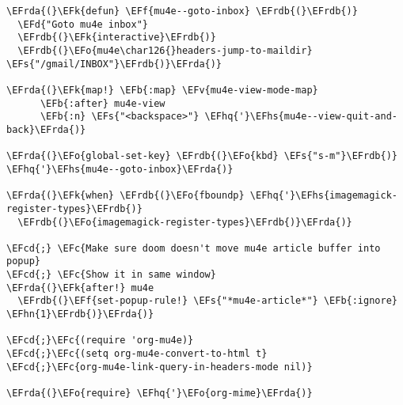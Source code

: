 \documentclass[a4wide,10pt]{article}
\newcommand{\EFc}[1]{\textcolor{EFc}{#1}} %
\newcommand{\EFcd}[1]{\textcolor{EFcd}{#1}} %
\newcommand{\EFs}[1]{\textcolor{EFs}{#1}} %
\newcommand{\EFd}[1]{\textcolor{EFd}{#1}} %
\newcommand{\EFk}[1]{\textcolor{EFk}{#1}} %
\newcommand{\EFb}[1]{\textcolor{EFb}{#1}} %
\newcommand{\EFf}[1]{\textcolor{EFf}{#1}} %
\newcommand{\EFv}[1]{\textcolor{EFv}{#1}} %
\newcommand{\EFo}[1]{\textcolor{EFo}{#1}} %
\newcommand{\EFhn}[1]{\textcolor{EFhn}{\textbf{#1}}} %
\newcommand{\EFhq}[1]{\textcolor{EFhq}{#1}} %
\newcommand{\EFhs}[1]{\textcolor{EFhs}{#1}} %
\newcommand{\EFrda}[1]{\textcolor{EFrda}{#1}} %
\newcommand{\EFrdb}[1]{\textcolor{EFrdb}{#1}} %
\begin{document}
\begin{Code}
\begin{Verbatim}
\EFrda{(}\EFk{defun} \EFf{mu4e--goto-inbox} \EFrdb{(}\EFrdb{)}
  \EFd{"Goto mu4e inbox"}
  \EFrdb{(}\EFk{interactive}\EFrdb{)}
  \EFrdb{(}\EFo{mu4e\char126{}headers-jump-to-maildir} \EFs{"/gmail/INBOX"}\EFrdb{)}\EFrda{)}

\EFrda{(}\EFk{map!} \EFb{:map} \EFv{mu4e-view-mode-map}
      \EFb{:after} mu4e-view
      \EFb{:n} \EFs{"<backspace>"} \EFhq{'}\EFhs{mu4e--view-quit-and-back}\EFrda{)}

\EFrda{(}\EFo{global-set-key} \EFrdb{(}\EFo{kbd} \EFs{"s-m"}\EFrdb{)} \EFhq{'}\EFhs{mu4e--goto-inbox}\EFrda{)}

\EFrda{(}\EFk{when} \EFrdb{(}\EFo{fboundp} \EFhq{'}\EFhs{imagemagick-register-types}\EFrdb{)}
  \EFrdb{(}\EFo{imagemagick-register-types}\EFrdb{)}\EFrda{)}

\EFcd{;} \EFc{Make sure doom doesn't move mu4e article buffer into popup}
\EFcd{;} \EFc{Show it in same window}
\EFrda{(}\EFk{after!} mu4e
  \EFrdb{(}\EFf{set-popup-rule!} \EFs{"*mu4e-article*"} \EFb{:ignore} \EFhn{1}\EFrdb{)}\EFrda{)}

\EFcd{;}\EFc{(require 'org-mu4e)}
\EFcd{;}\EFc{(setq org-mu4e-convert-to-html t}
\EFcd{;}\EFc{org-mu4e-link-query-in-headers-mode nil)}

\EFrda{(}\EFo{require} \EFhq{'}\EFo{org-mime}\EFrda{)}


\end{Verbatim}
\end{Code}
\end{document}
